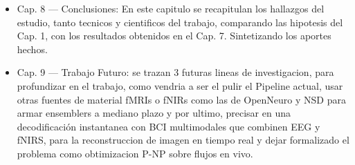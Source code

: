 \begin{itemize}
\item Cap. 8 --- Conclusiones: En este capitulo se recapitulan los hallazgos del 
estudio, tanto tecnicos y cientificos del trabajo, comparando las hipotesis del Cap. 1, 
con los resultados obtenidos en el Cap. 7. Sintetizando los aportes hechos.

\item Cap. 9 --- Trabajo Futuro: se trazan 3 futuras lineas de investigacion, para 
profundizar en el trabajo, como vendria a ser el pulir el Pipeline actual, usar otras fuentes
de material fMRIs o fNIRs como las de OpenNeuro y NSD para armar ensemblers a mediano plazo
y por ultimo, precisar en una decodificación instantanea con BCI multimodales que combinen
EEG y fNIRS, para la reconstruccion de imagen en tiempo real y dejar formalizado el problema 
como obtimizacion P-NP sobre flujos en vivo.
\end{itemize}

\afterpage{\blankpage}

